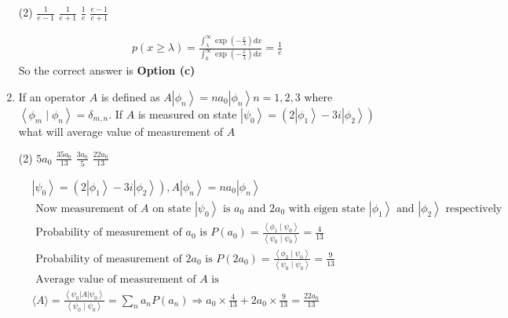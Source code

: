 \begin{enumerate}
 \begin{tasks}(2)
	\task[\textbf{a.}]$\frac{1}{e-1}$
	\task[\textbf{b.}]$\frac{1}{e+1}$
	\task[\textbf{c.}]$\frac{1}{e}$
	\task[\textbf{d.}] $\frac{e-1}{e+1}$ 
\end{tasks}
\begin{answer}
	$$
	\begin{aligned}
	p(x \geq \lambda)=\frac{\int_{\lambda}^{\infty} \exp \left(-\frac{x}{\lambda}\right) d x}{\int_{0}^{\infty} \exp \left(-\frac{x}{\lambda}\right) d x}=\frac{1}{e}
\end{aligned}
$$
So the correct answer is \textbf{Option (c)}
\end{answer}
\item If an operator $A$ is defined as $A\left|\phi_{n}\right\rangle=n a_{0}\left|\phi_{n}\right\rangle n=1,2,3$ where $\left\langle\phi_{m} \mid \phi_{n}\right\rangle=\delta_{m, n}$. If $A$ is measured on state $\left|\psi_{0}\right\rangle=\left(2\left|\phi_{1}\right\rangle-3 i\left|\phi_{2}\right\rangle\right)$ what will average value of measurement of $A$
 \begin{tasks}(2)
	\task[\textbf{a.}]$5 a_{0}$
	\task[\textbf{b.}]$\frac{35 a_{0}}{13}$
	\task[\textbf{c.}]$\frac{3 a_{0}}{5}$
	\task[\textbf{d.}] $\frac{22 a_{0}}{13}$
\end{tasks}
\begin{answer}
	$$
	\begin{aligned}
	&\left|\psi_{0}\right\rangle=\left(2\left|\phi_{1}\right\rangle-3 i\left|\phi_{2}\right\rangle\right), A\left|\phi_{n}\right\rangle=n a_{0}\left|\phi_{n}\right\rangle\\
	&\text { Now measurement of } A \text { on state }\left|\psi_{0}\right\rangle \text { is } a_{0} \text { and } 2 a_{0} \text { with eigen state }\left|\phi_{1}\right\rangle \text { and }\left|\phi_{2}\right\rangle  \text { respectively }\\
	&\text { Probability of measurement of } a_{0} \text { is } P\left(a_{0}\right)=\frac{\left\langle\phi_{1} \mid \psi_{0}\right\rangle}{\left\langle\psi_{0} \mid \psi_{0}\right\rangle}=\frac{4}{13}\\
	&\text { Probability of measurement of } 2 a_{0} \text { is } P\left(2 a_{0}\right)=\frac{\left\langle\phi_{2} \mid \psi_{0}\right\rangle}{\left\langle\psi_{0} \mid \psi_{0}\right\rangle}=\frac{9}{13}\\
	&\text { Average value of measurement of } A \text { is }\\
	&\langle A\rangle=\frac{\left\langle\psi_{0}|A| \psi_{0}\right\rangle}{\left\langle\psi_{0} \mid \psi_{0}\right\rangle}=\sum_{n} a_{n} P\left(a_{n}\right) \Rightarrow a_{0} \times \frac{4}{13}+2 a_{0} \times \frac{9}{13}=\frac{22 a_{0}}{13}

\end{aligned}$$
\end{answer}
\end{enumerate}
